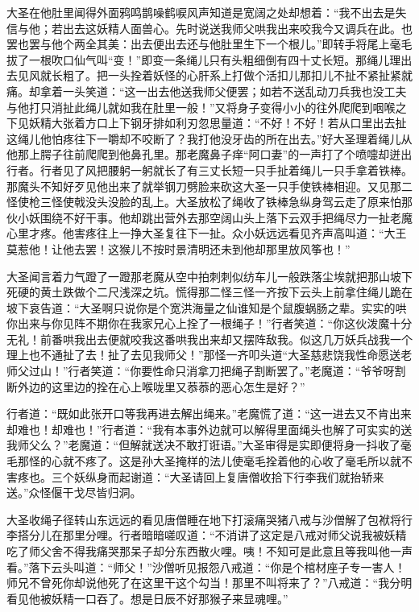 \documentclass[12pt,UTF8]{ctexbook}
\begin{document}
大圣在他肚里闻得外面鸦鸣鹊噪鹤唳风声知道是宽阔之处却想着：“我不出去是失信与他；若出去这妖精人面兽心。先时说送我师父哄我出来咬我今又调兵在此。也罢也罢与他个两全其美：出去便出去还与他肚里生下一个根儿。”即转手将尾上毫毛拔了一根吹口仙气叫“变！”即变一条绳儿只有头粗细倒有四十丈长短。那绳儿理出去见风就长粗了。把一头拴着妖怪的心肝系上打做个活扣儿那扣儿不扯不紧扯紧就痛。却拿着一头笑道：“这一出去他送我师父便罢；如若不送乱动刀兵我也没工夫与他打只消扯此绳儿就如我在肚里一般！”又将身子变得小小的往外爬爬到咽喉之下见妖精大张着方口上下钢牙排如利刃忽思量道：“不好！不好！若从口里出去扯这绳儿他怕疼往下一嚼却不咬断了？我打他没牙齿的所在出去。”好大圣理着绳儿从他那上腭子往前爬爬到他鼻孔里。那老魔鼻子痒“阿口妻”的一声打了个喷嚏却迸出行者。行者见了风把腰躬一躬就长了有三丈长短一只手扯着绳儿一只手拿着铁棒。那魔头不知好歹见他出来了就举钢刀劈脸来砍这大圣一只手使铁棒相迎。又见那二怪使枪三怪使戟没头没脸的乱上。大圣放松了绳收了铁棒急纵身驾云走了原来怕那伙小妖围绕不好干事。他却跳出营外去那空阔山头上落下云双手把绳尽力一扯老魔心里才疼。他害疼往上一挣大圣复往下一扯。众小妖远远看见齐声高叫道：“大王莫惹他！让他去罢！这猴儿不按时景清明还未到他却那里放风筝也！”

大圣闻言着力气蹬了一蹬那老魔从空中拍刺刺似纺车儿一般跌落尘埃就把那山坡下死硬的黄土跌做个二尺浅深之坑。慌得那二怪三怪一齐按下云头上前拿住绳儿跪在坡下哀告道：“大圣啊只说你是个宽洪海量之仙谁知是个鼠腹蜗肠之辈。实实的哄你出来与你见阵不期你在我家兄心上拴了一根绳子！”行者笑道：“你这伙泼魔十分无礼！前番哄我出去便就咬我这番哄我出来却又摆阵敌我。似这几万妖兵战我一个理上也不通扯了去！扯了去见我师父！”那怪一齐叩头道“大圣慈悲饶我性命愿送老师父过山！”行者笑道：“你要性命只消拿刀把绳子割断罢了。”老魔道：“爷爷呀割断外边的这里边的拴在心上喉咙里又菾菾的恶心怎生是好？”

行者道：“既如此张开口等我再进去解出绳来。”老魔慌了道：“这一进去又不肯出来却难也！却难也！”行者道：“我有本事外边就可以解得里面绳头也解了可实实的送我师父么？”老魔道：“但解就送决不敢打诳语。”大圣审得是实即便将身一抖收了毫毛那怪的心就不疼了。这是孙大圣掩样的法儿使毫毛拴着他的心收了毫毛所以就不害疼也。三个妖纵身而起谢道：“大圣请回上复唐僧收拾下行李我们就抬轿来送。”众怪偃干戈尽皆归洞。

大圣收绳子径转山东远远的看见唐僧睡在地下打滚痛哭猪八戒与沙僧解了包袱将行李搭分儿在那里分哩。行者暗暗嗟叹道：“不消讲了这定是八戒对师父说我被妖精吃了师父舍不得我痛哭那呆子却分东西散火哩。咦！不知可是此意且等我叫他一声看。”落下云头叫道：“师父！”沙僧听见报怨八戒道：“你是个棺材座子专一害人！师兄不曾死你却说他死了在这里干这个勾当！那里不叫将来了？”八戒道：“我分明看见他被妖精一口吞了。想是日辰不好那猴子来显魂哩。”
\end{document}
